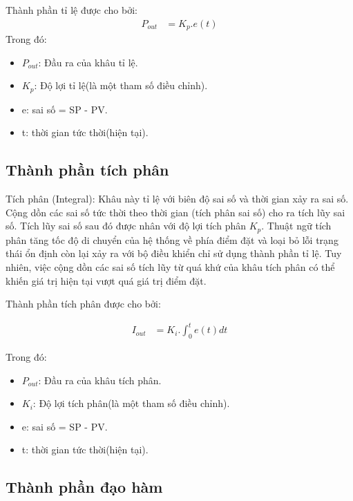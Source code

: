 Thành phần tỉ lệ được cho bởi:
\begin{align}
	P_{out} &= K_p.e(t)
\end{align} 
Trong đó:

\begin{itemize}
	
	\item $P_{out}$: Đầu ra của khâu tỉ lệ.
	\item $K_p$: Độ lợi tỉ lệ(là một tham số điều chỉnh).
	\item e: sai số = SP - PV.
	\item t: thời gian tức thời(hiện tại).
	
\end{itemize}

\subsection{Thành phần tích phân}

Tích phân (Integral): Khâu này tỉ lệ với biên độ sai số và thời gian xảy ra sai số. Cộng dồn các sai số tức thời theo thời gian (tích phân sai số) cho ra tích lũy sai số. Tích lũy sai số sau đó được nhân với độ lợi tích phân $K_p$. Thuật ngữ tích phân tăng tốc độ di chuyển của hệ thống về phía điểm đặt và loại bỏ lỗi trạng thái ổn định còn lại xảy ra với bộ điều khiển chỉ sử dụng thành phần tỉ lệ. Tuy nhiên, việc cộng dồn các sai số tích lũy từ quá khứ của khâu tích phân có thể khiến giá trị hiện tại vượt quá giá trị điểm đặt.

Thành phần tích phân được cho bởi:

\begin{align}
	I_{out} &= K_i.\int_{0}^{t}e(t)dt
\end{align}

Trong đó:

\begin{itemize}
	
	\item $P_{out}$: Đầu ra của khâu tích phân.
	\item $K_i$: Độ lợi tích phân(là một tham số điều chỉnh).
	\item e: sai số = SP - PV.
	\item t: thời gian tức thời(hiện tại).
	
\end{itemize}

\subsection{Thành phần đạo hàm}


